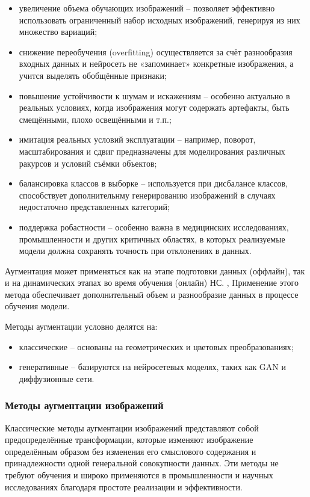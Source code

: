 \begin{itemize}
	\item увеличение объема обучающих изображений – позволяет эффективно использовать ограниченный набор исходных изображений, генерируя из них множество вариаций;
	\item снижение переобучения (overfitting) осуществляется за счёт разнообразия входных данных и нейросеть не «запоминает» конкретные изображения, а учится выделять обобщённые признаки;
	\item повышение устойчивости к шумам и искажениям – особенно актуально в реальных условиях, когда изображения могут содержать артефакты, быть смещёнными, плохо освещёнными и т.п.;
	\item имитация реальных условий эксплуатации – например, поворот, масштабирования и сдвиг предназначены для моделирования различных ракурсов и условий съёмки объектов;
	\item балансировка классов в выборке – используется при дисбалансе классов, способствует дополнительнму генерированию изображений в случаях недостаточно представленных категорий;
	\item поддержка робастности – особенно важна в медицинских исследованиях, промышленности и других критичных областях, в которых реализуемые модели должна сохранять точность при отклонениях в данных.
\end{itemize}

Аугментация может применяться как на этапе подготовки данных (оффлайн), так и на динамических этапах во время обучения (онлайн) НС. , Применение этого метода обеспечивает дополнительный объем и разнообразие данных в процессе обучения модели.

Методы аугментации условно делятся на:

\begin{itemize}
	\item классические – основаны на геометрических и цветовых преобразованиях;
	\item генеративные – базируются на нейросетевых моделях, таких как GAN и диффузионные сети.
\end{itemize}

\subsubsection{Методы аугментации изображений}

Классические методы аугментации изображений представляют собой предопределённые трансформации, которые изменяют изображение определённым образом без изменения его смыслового содержания и принадлежности одной генеральной совокупности данных. Эти методы не требуют обучения и широко применяются в промышленности и научных исследованиях благодаря простоте реализации и эффективности.

